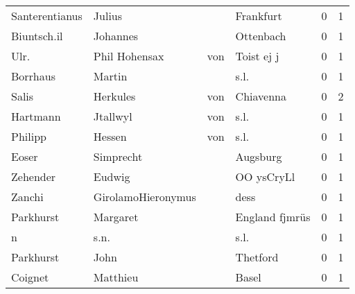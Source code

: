 \begin{center}
\begin{tiny}
\begin{longtabu}{llllrr}
           Santerentianus &                             Julius &             &                                   Frankfurt &          0 &         1 \\
              Biuntsch.il &                           Johannes &             &                                   Ottenbach &          0 &         1 \\
                     Ulr. &                     Phil  Hohensax &         von &                                  Toist ej j &          0 &         1 \\
                 Borrhaus &                             Martin &             &                                        s.l. &          0 &         1 \\
                    Salis &                           Herkules &         von &                                   Chiavenna &          0 &         2 \\
                 Hartmann &                           Jtallwyl &         von &                                        s.l. &          0 &         1 \\
                  Philipp &                             Hessen &         von &                                        s.l. &          0 &         1 \\
                    Eoser &                          Simprecht &             &                                    Augsburg &          0 &         1 \\
                 Zehender &                             Eudwig &             &                                  OO ysCryLl &          0 &         1 \\
                   Zanchi &                 GirolamoHieronymus &             &                                        dess &          0 &         1 \\
                Parkhurst &                           Margaret &             &                              England fjmrüs &          0 &         1 \\
                        n &                               s.n. &             &                                        s.l. &          0 &         1 \\
                Parkhurst &                               John &             &                                    Thetford &          0 &         1 \\
                  Coignet &                           Matthieu &             &                                       Basel &          0 &         1 \\

\end{longtabu}
\end{tiny}
\end{center}
